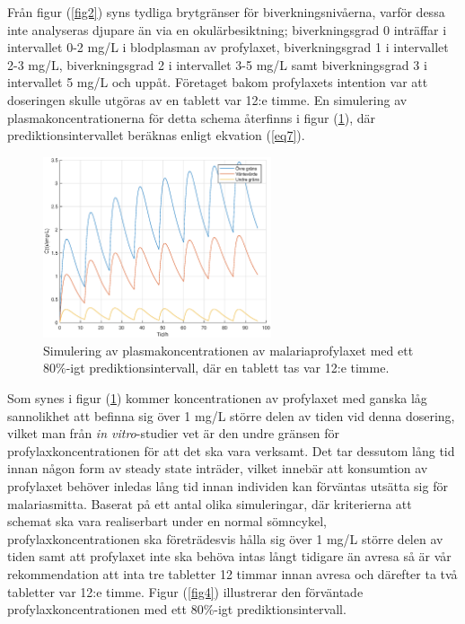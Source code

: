\documentclass[a4paper,11pt]{article}
\begin{document}
Från figur (\ref{fig2}) syns tydliga brytgränser för biverkningsnivåerna, varför dessa inte analyseras djupare än via en okulärbesiktning; biverkningsgrad 0 inträffar i intervallet 0-2 mg/L i blodplasman av profylaxet, biverkningsgrad 1 i intervallet 2-3 mg/L, biverkningsgrad 2 i intervallet 3-5 mg/L samt biverkningsgrad 3 i intervallet 5 mg/L och uppåt. Företaget bakom profylaxets intention var att doseringen skulle utgöras av en tablett var 12:e timme. En simulering av plasmakoncentrationerna för detta schema återfinns i figur (\ref{fig3}), där prediktionsintervallet beräknas enligt ekvation (\ref{eq7}).
\begin{figure}[H]
\centering
\includegraphics[width=0.6\textwidth]{fig3.eps}
\caption{\label{fig3}Simulering av plasmakoncentrationen av malariaprofylaxet med ett 80\%-igt prediktionsintervall, där en tablett tas var 12:e timme.}
\end{figure}
Som synes i figur (\ref{fig3}) kommer koncentrationen av profylaxet med ganska låg sannolikhet att befinna sig över 1 mg/L större delen av tiden vid denna dosering, vilket man från \textit{in vitro}-studier vet är den undre gränsen för profylaxkoncentrationen för att det ska vara verksamt. Det tar dessutom lång tid innan någon form av steady state inträder, vilket innebär att konsumtion av profylaxet behöver inledas lång tid innan individen kan förväntas utsätta sig för malariasmitta. Baserat på ett antal olika simuleringar, där kriterierna att schemat ska vara realiserbart under en normal sömncykel, profylaxkoncentrationen ska företrädesvis hålla sig över 1 mg/L större delen av tiden samt att profylaxet inte ska behöva intas långt tidigare än avresa så är vår rekommendation att inta tre tabletter 12 timmar innan avresa och därefter ta två tabletter var 12:e timme. Figur (\ref{fig4}) illustrerar den förväntade profylaxkoncentrationen med ett 80\%-igt prediktionsintervall.
\end{document}
